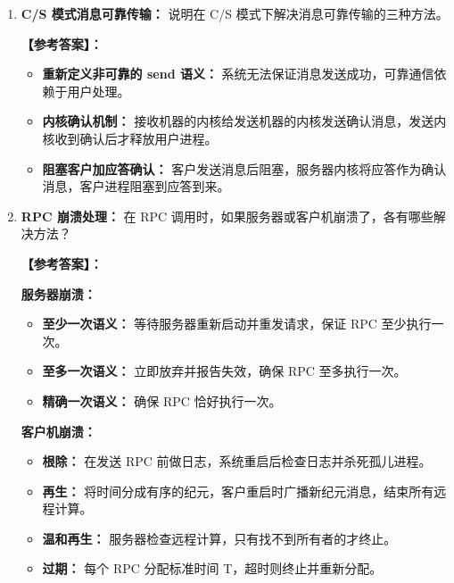 \documentclass[a4paper,12pt]{article}
\newcommand{\answer}[1]{\par\vspace{0.5em}\hspace{2em}\textbf{【参考答案】：}\\{\color{blue}#1}\par\vspace{1em}}
\begin{document}
\begin{enumerate}[label=\arabic*.]
    \answer{
    \textbf{编址方法：}
    \begin{itemize}
        \item \textbf{机器号加进程号：} 内核使用机器号将消息发送到适当的机器，用进程号决定接收进程。
        \item \textbf{随机地址加广播定位：} 进程在大的地址空间中随机指定标识号，在支持广播的 LAN 中通过广播定位。
        \item \textbf{ASCII 码访问：} 客户机向名字服务器发送请求，名字服务器将 ASCII 服务器名映射成服务器地址。
    \end{itemize}
    }

    \item \textbf{C/S 模式消息可靠传输：}
    说明在 C/S 模式下解决消息可靠传输的三种方法。
    
    \answer{
    \begin{itemize}
        \item \textbf{重新定义非可靠的 send 语义：} 系统无法保证消息发送成功，可靠通信依赖于用户处理。
        \item \textbf{内核确认机制：} 接收机器的内核给发送机器的内核发送确认消息，发送内核收到确认后才释放用户进程。
        \item \textbf{阻塞客户加应答确认：} 客户发送消息后阻塞，服务器内核将应答作为确认消息，客户进程阻塞到应答到来。
    \end{itemize}
    }

    \item \textbf{RPC 崩溃处理：}
    在 RPC 调用时，如果服务器或客户机崩溃了，各有哪些解决方法？
    
    \answer{
    \textbf{服务器崩溃：}
    \begin{itemize}
        \item \textbf{至少一次语义：} 等待服务器重新启动并重发请求，保证 RPC 至少执行一次。
        \item \textbf{至多一次语义：} 立即放弃并报告失效，确保 RPC 至多执行一次。
        \item \textbf{精确一次语义：} 确保 RPC 恰好执行一次。
    \end{itemize}
    
    \textbf{客户机崩溃：}
    \begin{itemize}
        \item \textbf{根除：} 在发送 RPC 前做日志，系统重启后检查日志并杀死孤儿进程。
        \item \textbf{再生：} 将时间分成有序的纪元，客户重启时广播新纪元消息，结束所有远程计算。
        \item \textbf{温和再生：} 服务器检查远程计算，只有找不到所有者的才终止。
        \item \textbf{过期：} 每个 RPC 分配标准时间 T，超时则终止并重新分配。
    \end{itemize}
    }
\end{enumerate}
\end{document}
